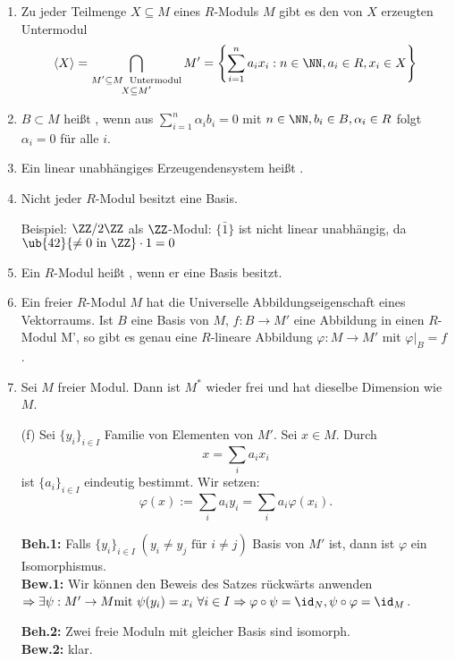 \begin{Bem}
  \begin{enumerate}
    \item Zu jeder Teilmenge $X \subseteq M$ eines $R$-Moduls $M$ gibt es den von
          $X$ erzeugten Untermodul $$\langle X \rangle = \displaystyle 
          \bigcap_{\substack{M' \subseteq M\; \text{ Untermodul} \\ X \subseteq M'}} M' = \left\{
          \sum_{i=1}^n a_i x_i: n \in \NN, a_i \in R, x_i \in X \right\}$$
    \item $B \subset M$ heißt ,
          wenn aus $\displaystyle \sum_{i=1}^n \alpha_i b_i = 0$ mit $n \in
          \NN, b_i \in B, \alpha_i \in R$ folgt $\alpha_i = 0$ für alle
          $i$.
    \item Ein linear unabhängiges Erzeugendensystem heißt
          .
    \item Nicht jeder $R$-Modul besitzt eine Basis.

          Beispiel: $\ZZ/2\ZZ$ als $\ZZ$-Modul: $\{\bar{1}\}$
          ist nicht linear unabhängig, da $\ub{42}{\not= 0 \text{ in } \ZZ} \cdot 1 = 0$
    \item Ein $R$-Modul heißt , wenn er eine
          Basis besitzt.
    \item Ein freier $R$-Modul $M$ hat die Universelle Abbildungseigenschaft eines Vektorraums. Ist $B$ eine
          Basis von $M$, $f: B \to M'$ eine Abbildung in einen $R$-Modul M', so
          gibt es genau eine $R$-lineare Abbildung $\varphi: M \to M'$ mit
          $\varphi|_B = f$.
    \item Sei $M$ freier Modul. Dann ist $M^*$ wieder frei und hat dieselbe
          Dimension wie $M$.
  \end{enumerate}
\end{Bem}

\begin{Bew}
\begin{enumerate}
\item[(f)] Sei $\{y_i\}_{i \in I}$ Familie von Elementen von $M'$.
Sei $x \in M$. Durch
\[
x=\sum_{i}a_ix_i
\]
ist $\{a_i\}_{i  \in I}$ eindeutig bestimmt. Wir setzen:
\[
\varphi(x):=\sum_i a_iy_i=\sum_ia_i\varphi(x_i).
\]

\textbf{Beh.1:} Falls $\{y_i\}_{i\in I}\;(y_i \neq y_j \text{ für } i\neq
j)$ Basis von $M'$ ist, dann ist $\varphi$ ein Isomorphismus.\\
\textbf{Bew.1:} Wir können den Beweis des Satzes rückwärts anwenden
$\Rightarrow \exists \psi:
M' \rightarrow M \text{mit } \psi(y_i)=x_i \ \forall i \in I \Rightarrow
\varphi \circ \psi = \id_N, \psi \circ \varphi = \id_M$.

\textbf{Beh.2:} Zwei freie Moduln mit gleicher Basis sind isomorph.\\
\textbf{Bew.2:} klar.
\end{enumerate}
\end{Bew}

